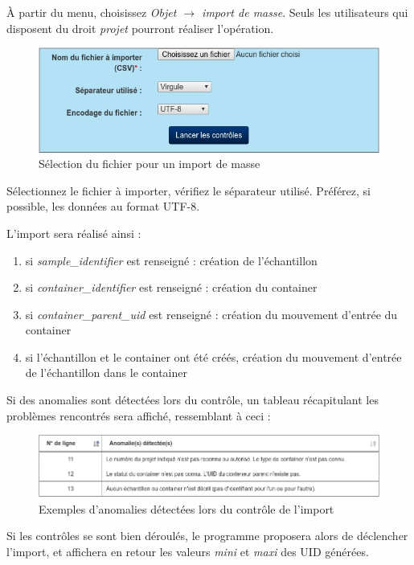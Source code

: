 À partir du menu, choisissez \textit{Objet $\rightarrow$ import de masse}. Seuls les utilisateurs qui disposent du droit \textit{projet} pourront réaliser l'opération.
\begin{figure}[H]
\includegraphics[width=\linewidth]{images/import_controle}
\caption{Sélection du fichier pour un import de masse}
\end{figure}

Sélectionnez le fichier à importer, vérifiez le séparateur utilisé. Préférez, si possible, les données au format UTF-8.

L'import sera réalisé ainsi :
\begin{enumerate}
\item si \textit{sample\_identifier} est renseigné : création de l'échantillon
\item si \textit{container\_identifier} est renseigné : création du container
\item si \textit{container\_parent\_uid} est renseigné : création du mouvement d'entrée du container
\item si l'échantillon et le container ont été créés, création du mouvement d'entrée de l'échantillon dans le container
\end{enumerate}

Si des anomalies sont détectées lors du contrôle, un tableau récapitulant les problèmes rencontrés sera affiché, ressemblant à ceci :
\begin{figure}[H]
\includegraphics[width=\linewidth]{images/import_tableau}
\caption{Exemples d'anomalies détectées lors du contrôle de l'import}
\end{figure}

Si les contrôles se sont bien déroulés, le programme proposera alors de déclencher l'import, et affichera en retour les valeurs \textit{mini} et \textit{maxi} des UID générées.

